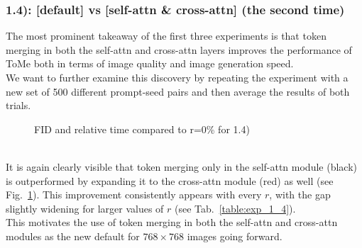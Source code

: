 \subsubsection*{1.4): [default] vs [self-attn \& cross-attn] (the second time)}
The most prominent takeaway of the first three experiments is that token merging in both the self-attn and cross-attn layers improves the performance of ToMe both in terms of image quality and image generation speed.\\
We want to further examine this discovery by repeating the experiment with a new set of 500 different prompt-seed pairs and then average the results of both trials.
\begin{figure}[!htb]
    
    
\caption{FID and relative time compared to r=0\% for 1.4)}
\label{fig:exp_1_4}
\end{figure}\\
It is again clearly visible that token merging only in the self-attn module (black) is outperformed by expanding it to the cross-attn module (red) as well (see Fig.~\ref{fig:exp_1_4}). This improvement consistently appears with every \(r\), with the gap slightly widening for larger values of \(r\) (see Tab.~\ref{table:exp_1_4}).\\
This motivates the use of token merging in both the self-attn and cross-attn modules as the new default for $768 \times 768$ images going forward.



